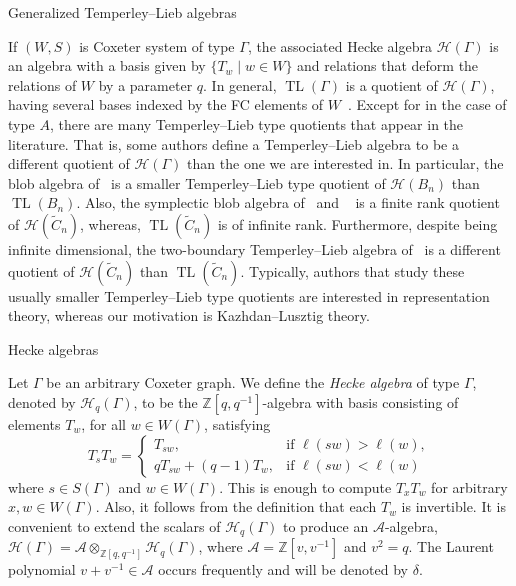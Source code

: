 \documentclass[11pt]{amsart}
\theoremstyle{definition}
\numberwithin{equation}{section}
\newcommand{\Z}{\mathbb{Z}}
\newcommand{\A}{\mathcal{A}}
\newcommand{\C}{\widetilde{C}}
\DeclareMathOperator{\TL}{TL}
\renewcommand{\(}{\left(}
\renewcommand{\)}{\right)}
\renewcommand{\H}{\mathcal{H}}
\begin{document}

\begin{section}{Generalized Temperley--Lieb algebras}\label{sec:gen TL-algebras}

If $(W,S)$ is Coxeter system of type $\Gamma$, the associated Hecke algebra $\H(\Gamma)$ is an algebra with a basis given by $\{T_w\mid w \in W\}$ and relations that deform the relations of $W$ by a parameter $q$. In general, $\TL(\Gamma)$ is a quotient of $\H(\Gamma)$, having several bases indexed by the FC elements of $W$~\cite[Theorem 6.2]{Graham1995}.  Except for in the case of type $A$, there are many Temperley--Lieb type quotients that appear in the literature.  That is,  some authors define a Temperley--Lieb algebra to be a different quotient of $\H(\Gamma)$ than the one we are interested in.  In particular, the blob algebra of~\cite{Martin1994} is a smaller Temperley--Lieb type quotient of $\H(B_{n})$ than $\TL(B_{n})$.  Also, the symplectic blob algebra of~\cite{Green2012} and ~\cite{Martin2007} is a finite rank quotient of $\H(\C_{n})$, whereas, $\TL(\C_{n})$ is of infinite rank.  Furthermore, despite being infinite dimensional, the two-boundary Temperley--Lieb algebra of~\cite{Gier2009} is a different quotient of $\H(\C_n)$ than $\TL(\C_{n})$.  Typically, authors that study these usually smaller Temperley--Lieb type quotients are interested in representation theory, whereas our motivation is Kazhdan--Lusztig theory.


\begin{subsection}{Hecke algebras}

Let $\Gamma$ be an arbitrary Coxeter graph.  We define the \emph{Hecke algebra} of type $\Gamma$, denoted by $\H_{q}(\Gamma)$, to be the $\Z[q,q^{-1}]$-algebra with basis consisting of elements $T_{w}$, for all $w \in W(\Gamma)$, satisfying
\[
T_{s}T_{w}=\begin{cases}
T_{sw},  & \text{if } \ell(sw)>\ell(w), \\
qT_{sw}+(q-1)T_{w},  & \text{if } \ell(sw)<\ell(w)
\end{cases}
\]
where $s \in S(\Gamma)$ and $w \in W(\Gamma)$.  This is enough to compute $T_{x}T_{w}$ for arbitrary $x, w \in W(\Gamma)$.  Also, it follows from the definition that each $T_{w}$ is invertible.  It is convenient to extend the scalars of $\H_{q}(\Gamma)$ to produce an $\A$-algebra, $\H(\Gamma)=\A \otimes_{\Z[q,q^{-1}]} \H_{q}(\Gamma)$, where $\A=\Z[v,v^{-1}]$ and $v^{2}=q$.  The Laurent polynomial $v+v^{-1} \in \A$ occurs frequently and will be denoted by $\delta$.  


\end{subsection}
\end{section}
\end{document}
